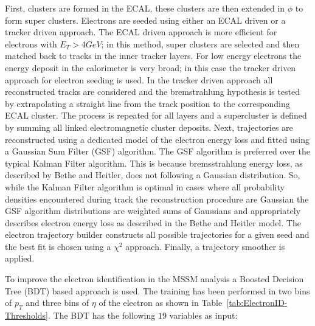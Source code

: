 First, clusters are formed in the ECAL, these clusters are then 
extended in $\phi$ to form super clusters.
Electrons are seeded using either an ECAL driven or a tracker driven approach.
The ECAL driven approach is more efficient for electrons with $E_{T}>4 GeV$;
in this method, super clusters are selected and then matched back to 
tracks in the inner tracker layers. 
For low energy electrons the energy deposit in the calorimeter
is very broad; in this case the tracker driven approach for electron seeding is used.
In the tracker driven approach all reconstructed tracks are considered
and the bremstrahlung hypothesis is tested
by extrapolating a straight line from the track position to the
corresponding ECAL cluster. The process is 
repeated for all layers and a supercluster is defined
by summing all linked electromagnetic cluster deposits. 
Next, trajectories are reconstructed using a dedicated
model of the electron energy loss and fitted using a Gaussian Sum Filter (GSF) algorithm. %
The GSF algorithm is preferred over the typical Kalman Filter algorithm.
This is because bremsstrahlung energy loss, %
as described by Bethe and Heitler, 
does not following a Gaussian distribution. 
So, while the Kalman Filter algorithm is optimal in cases where all probability
densities encountered during track the reconstruction procedure are Gaussian
the GSF algorithm distributions are weighted sums of Gaussians and
appropriately describes electron energy loss as described in the Bethe and Heitler model.
The electron trajectory builder constructs all possible trajectories
for a given seed and the best fit is chosen using a $\chi^{2}$ approach.
Finally, a trajectory smoother is applied.

To improve the electron identification in the MSSM analysis a Boosted Decision Tree (BDT) based %
approach is used. The training has been performed in two
bins of $p_{T}$ and three bins of $\eta$ of the electron as shown in Table~\ref{tab:ElectronID-Thresholds}\@.
The BDT has the following $19$ variables as input:


